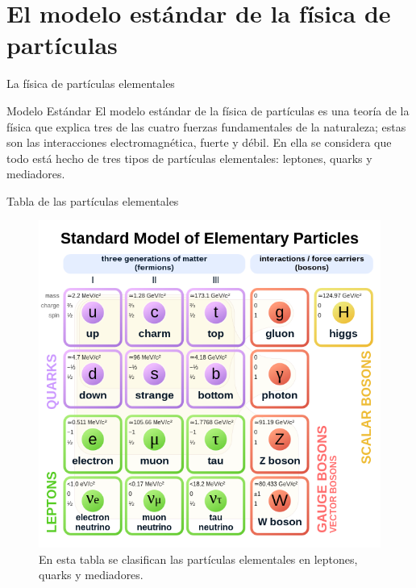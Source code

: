\section{El modelo estándar de la física de partículas}

\begin{frame}{La física de partículas elementales}
    \begin{block}{Modelo Estándar}
        El modelo estándar de la física de partículas es una teoría de la física que explica tres de las cuatro fuerzas fundamentales de la naturaleza; estas son las interacciones electromagnética, fuerte y débil. En ella se considera que todo está hecho de tres tipos de partículas elementales: leptones, quarks y mediadores. \cite{griffiths2020introduction}
    \end{block}
\end{frame}

\begin{frame}{Tabla de las partículas elementales}
    \begin{figure}
        \centering
        \includegraphics[scale=0.28]{pic/Standard_Model_of_Elementary_Particles.svg.png}
        \caption{En esta tabla se clasifican las partículas elementales en leptones, quarks y mediadores.}
        \label{fig:particles_table}
    \end{figure}
\end{frame}

